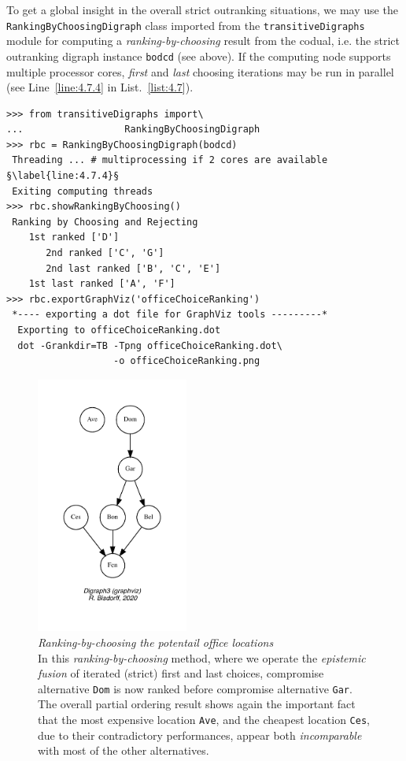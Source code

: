 To get a global insight in the overall strict outranking situations, we may use the \texttt{RankingByChoosingDigraph} class imported from the \texttt{transitive\-Digraphs} module for computing a \emph{ranking-by-choosing} result from the codual, i.e. the strict outranking digraph instance \texttt{bodcd} (see above). If the computing node supports multiple processor cores, \emph{first} and \emph{last} choosing iterations may be run in parallel (see Line~\ref{line:4.7.4} in List.~\vref{list:4.7}).
\begin{lstlisting}[caption={Ranking-by-choosing the outranking digraph},label=list:4.7]
>>> from transitiveDigraphs import\
...                  RankingByChoosingDigraph
>>> rbc = RankingByChoosingDigraph(bodcd)
 Threading ... # multiprocessing if 2 cores are available §\label{line:4.7.4}§
 Exiting computing threads
>>> rbc.showRankingByChoosing()
 Ranking by Choosing and Rejecting
    1st ranked ['D']
       2nd ranked ['C', 'G']
       2nd last ranked ['B', 'C', 'E']
    1st last ranked ['A', 'F']
>>> rbc.exportGraphViz('officeChoiceRanking')
 *---- exporting a dot file for GraphViz tools ---------*
  Exporting to officeChoiceRanking.dot
  dot -Grankdir=TB -Tpng officeChoiceRanking.dot\
                   -o officeChoiceRanking.png
\end{lstlisting}
\begin{figure}[ht]
\sidecaption[t]
\includegraphics[width=5cm]{Figures/4-4-officeChoiceRanking.pdf}
\caption[Ranking-by-choosing the potential office locations]{\emph{Ranking-by-choosing the potentail office locations}\\ In this \emph{ranking-by-choosing} method, where we operate the \emph{epistemic fusion} of iterated (strict) first and last choices, compromise alternative \texttt{Dom} is now ranked before compromise alternative \texttt{Gar}. The overall partial ordering result shows again the important fact that the most expensive location \texttt{Ave}, and the cheapest location \texttt{Ces}, due to their contradictory performances, appear both \emph{incomparable} with most of the other alternatives.} 
\label{fig:4.4}       %
\end{figure}


